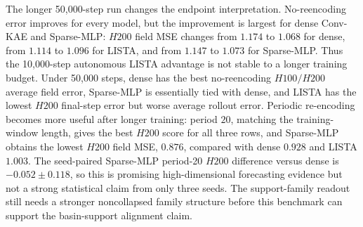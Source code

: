 \begin{table}[t]
  \centering
  \caption{Allen--Cahn no-reencoding H200 field MSE under longer training. The 50,000-step run reuses the same train/validation/test trajectories as the 10,000-step run.}
  \label{tab:allen_cahn_h200_10k_vs_50k}
  
\end{table}
\begin{table}[t]
  \centering
  \caption{Allen--Cahn 50,000-step no-reencoding pilot. Entries are mean held-out field MSE across three seeds; lower is better.}
  \label{tab:allen_cahn_h200_50k_no_reencode}
  
\end{table}
\begin{table}[t]
  \centering
  \caption{Allen--Cahn 50,000-step H200 field MSE by periodic re-encoding mode.}
  \label{tab:allen_cahn_h200_50k_reencode_modes}
  
\end{table}
The longer 50,000-step run changes the endpoint interpretation. No-reencoding error improves for every model, but the improvement is largest for dense Conv-KAE and Sparse-MLP: \(H200\) field MSE changes from \(1.174\) to \(1.068\) for dense, from \(1.114\) to \(1.096\) for LISTA, and from \(1.147\) to \(1.073\) for Sparse-MLP. Thus the 10,000-step autonomous LISTA advantage is not stable to a longer training budget. Under 50,000 steps, dense has the best no-reencoding \(H100/H200\) average field error, Sparse-MLP is essentially tied with dense, and LISTA has the lowest \(H200\) final-step error but worse average rollout error. Periodic re-encoding becomes more useful after longer training: period \(20\), matching the training-window length, gives the best \(H200\) score for all three rows, and Sparse-MLP obtains the lowest \(H200\) field MSE, \(0.876\), compared with dense \(0.928\) and LISTA \(1.003\). The seed-paired Sparse-MLP period-20 \(H200\) difference versus dense is \(-0.052\pm0.118\), so this is promising high-dimensional forecasting evidence but not a strong statistical claim from only three seeds. The support-family readout still needs a stronger noncollapsed family structure before this benchmark can support the basin-support alignment claim.

